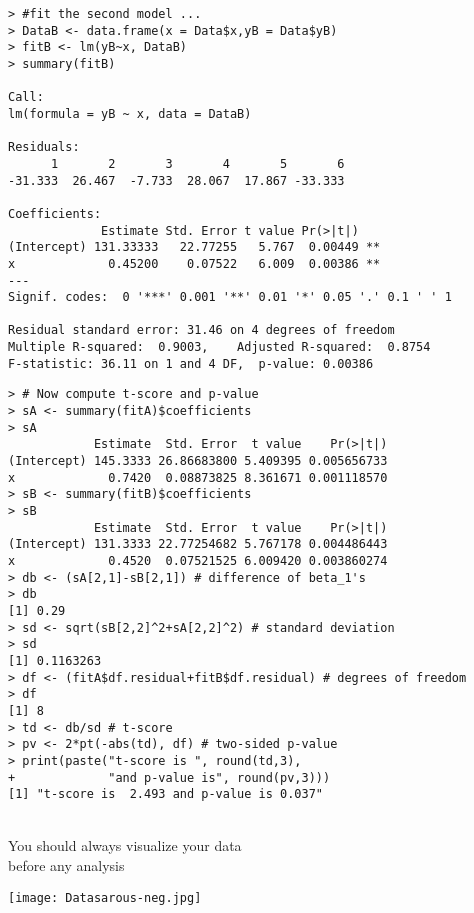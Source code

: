 \begin{frame}[fragile]
\begin{lstlisting}
> #fit the second model ...
> DataB <- data.frame(x = Data$x,yB = Data$yB)
> fitB <- lm(yB~x, DataB)
> summary(fitB)

Call:
lm(formula = yB ~ x, data = DataB)

Residuals:
      1       2       3       4       5       6
-31.333  26.467  -7.733  28.067  17.867 -33.333

Coefficients:
             Estimate Std. Error t value Pr(>|t|)
(Intercept) 131.33333   22.77255   5.767  0.00449 **
x             0.45200    0.07522   6.009  0.00386 **
---
Signif. codes:  0 '***' 0.001 '**' 0.01 '*' 0.05 '.' 0.1 ' ' 1

Residual standard error: 31.46 on 4 degrees of freedom
Multiple R-squared:  0.9003,	Adjusted R-squared:  0.8754
F-statistic: 36.11 on 1 and 4 DF,  p-value: 0.00386
\end{lstlisting}
\end{frame}
\begin{frame}[fragile]
\begin{lstlisting}
> # Now compute t-score and p-value
> sA <- summary(fitA)$coefficients
> sA
            Estimate  Std. Error  t value    Pr(>|t|)
(Intercept) 145.3333 26.86683800 5.409395 0.005656733
x             0.7420  0.08873825 8.361671 0.001118570
> sB <- summary(fitB)$coefficients
> sB
            Estimate  Std. Error  t value    Pr(>|t|)
(Intercept) 131.3333 22.77254682 5.767178 0.004486443
x             0.4520  0.07521525 6.009420 0.003860274
> db <- (sA[2,1]-sB[2,1]) # difference of beta_1's
> db
[1] 0.29
> sd <- sqrt(sB[2,2]^2+sA[2,2]^2) # standard deviation
> sd
[1] 0.1163263
> df <- (fitA$df.residual+fitB$df.residual) # degrees of freedom
> df
[1] 8
> td <- db/sd # t-score
> pv <- 2*pt(-abs(td), df) # two-sided p-value
> print(paste("t-score is ", round(td,3),
+             "and p-value is", round(pv,3)))
[1] "t-score is  2.493 and p-value is 0.037"
\end{lstlisting}
\end{frame}
\begin{frame}[fragile]{
	\dangersign[5ex]\\
You should always visualize your data \\
before any analysis}
	\begin{center}
		\texttt{[image: Datasarous-neg.jpg]}
	\end{center}
\end{frame}
